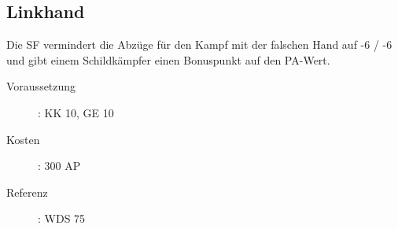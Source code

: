 \subsection{Linkhand}
\label{sf.linkhand}
Die SF  vermindert die Abzüge für den Kampf mit der falschen Hand auf -6 / -6 und gibt einem Schildkämpfer einen Bonuspunkt auf den PA-Wert.
\begin{description}
    \item[Voraussetzung]:
        KK 10, GE 10
    \item [Kosten]:
        300 AP
    \item [Referenz]:
        WDS 75
\end{description}
